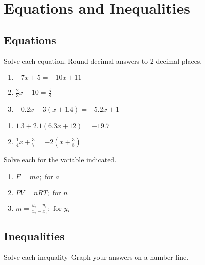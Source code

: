 \chapter{Equations and Inequalities}

\section*{Equations}

Solve each equation. Round decimal answers to 2 decimal places.

\begin{multicols}{3}
\begin{enumerate}
	\item $-7x + 5 = -10x + 11$
	\item $\frac{2}{3}x - 10 = \frac{5}{8}$
	\item $-0.2x - 3(x+1.4) = -5.2x + 1$
\end{enumerate}	\setcounter{Review}{\value{enumi}}
\end{multicols}
\begin{multicols}{3}
\begin{enumerate}	\setcounter{enumi}{\value{Review}}
	\item $1.3 + 2.1(6.3x + 12) = -19.7$
	\item $\frac{1}{4}x + \frac{3}{7} = -2\left(x + \frac{3}{8}\right)$
\end{enumerate}	\setcounter{Review}{\value{enumi}}
\end{multicols}

Solve each for the variable indicated.

\begin{multicols}{3}
\begin{enumerate}	\setcounter{enumi}{\value{Review}}
	\item $F = ma; \text{ for } a$
	\item $PV = nRT; \text{ for } n$
	\item $m = \frac{y_2-y_1}{x_2-x_1}; \text{ for } y_2$
\end{enumerate}	\setcounter{Review}{\value{enumi}}
\end{multicols}



\section*{Inequalities}

Solve each inequality. Graph your answers on a number line.

